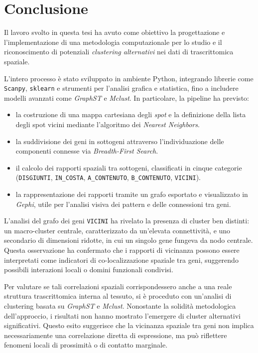 \chapter{Conclusione}\label{chapter:conclusione}%
Il lavoro svolto in questa tesi ha avuto come obiettivo 
la progettazione e l'implementazione di una metodologia computazionale 
per lo studio e il riconoscimento di potenziali 
\textit{clustering alternativi} nei dati di trascrittomica spaziale.  

\medskip
L'intero processo è stato sviluppato in ambiente Python, integrando librerie come \texttt{Scanpy}, \texttt{sklearn} e strumenti per l'analisi grafica e statistica, fino a includere modelli avanzati come \textit{GraphST} e \textit{Mclust}.  
In particolare, la pipeline ha previsto:  
\begin{itemize}
  \item la costruzione di una mappa cartesiana degli \textit{spot} e la definizione della lista degli spot vicini mediante l'algoritmo dei \textit{Nearest Neighbors}.
  \item la suddivisione dei geni in sottogeni attraverso l'individuazione delle componenti connesse via \textit{Breadth-First Search}.
  \item il calcolo dei rapporti spaziali tra sottogeni, classificati in cinque categorie (\texttt{DISGIUNTI}, \texttt{IN\_COSTA}, \texttt{A\_CONTENUTO}, \texttt{B\_CONTENUTO}, \texttt{VICINI}).
  \item la rappresentazione dei rapporti tramite un grafo esportato e visualizzato in \textit{Gephi}, utile per l'analisi visiva dei pattern e delle connessioni tra geni.
\end{itemize}

\medskip
L'analisi del grafo dei geni \texttt{VICINI} ha rivelato la presenza di cluster ben distinti: un macro-cluster centrale, caratterizzato da un'elevata connettività, e uno secondario di dimensioni ridotte, in cui un singolo gene fungeva da nodo centrale.  
Questa osservazione ha confermato che i rapporti di vicinanza possono essere interpretati come indicatori di co-localizzazione spaziale tra geni, suggerendo possibili interazioni locali o domini funzionali condivisi.

\medskip
Per valutare se tali correlazioni spaziali corrispondessero anche a una reale struttura trascrittomica interna al tessuto, si è proceduto con un'analisi di clustering basata su \textit{GraphST} e \textit{Mclust}.  
Nonostante la solidità metodologica dell'approccio, i risultati non hanno mostrato l'emergere di cluster alternativi significativi.  
Questo esito suggerisce che la vicinanza spaziale tra geni non implica necessariamente una correlazione diretta di espressione, ma può riflettere fenomeni locali di prossimità o di contatto marginale.

